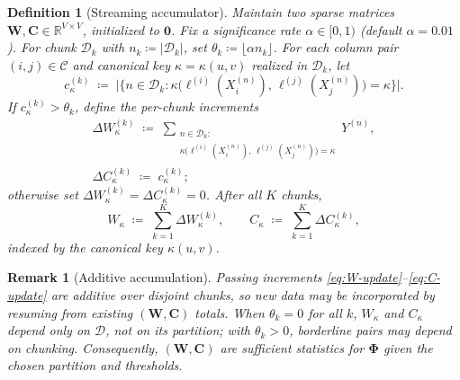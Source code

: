 \documentclass[11pt]{article}
\newtheorem{definition}{Definition}
\newtheorem{remark}{Remark}
\begin{document}
\begin{definition}[Streaming accumulator]
\label{def:accumulator}
Maintain two sparse matrices $\bm{W}, \bm{C} \in \mathbb{R}^{V \times V}$, initialized to $\bm{0}$.
Fix a significance rate $\alpha \in [0,1)$ (default $\alpha = 0.01$).
For chunk $\mathcal{D}_k$ with $n_k \coloneqq |\mathcal{D}_k|$, set $\theta_k \coloneqq \lfloor \alpha n_k \rfloor$.
For each column pair $(i,j) \in \mathcal{C}$ and canonical key $\kappa = \kappa(u,v)$ realized in $\mathcal{D}_k$, let
\[
  c_{\kappa}^{(k)} \;\coloneqq\;
  \bigl|\bigl\{n \in \mathcal{D}_k :
  \kappa\bigl(\ell^{(i)}(X_i^{(n)}),\,\ell^{(j)}(X_j^{(n)})\bigr) = \kappa\bigr\}\bigr|.
\]
If $c_{\kappa}^{(k)} > \theta_k$, define the per-chunk increments
\begin{align}
  \Delta W_{\kappa}^{(k)} \;\coloneqq\;
  \sum_{\substack{n \in \mathcal{D}_k :\\ \kappa\bigl(\ell^{(i)}(X_i^{(n)}),\,\ell^{(j)}(X_j^{(n)})\bigr)=\kappa}} Y^{(n)},
  \label{eq:W-update}\\[6pt]
  \Delta C_{\kappa}^{(k)} \;\coloneqq\; c_{\kappa}^{(k)};
  \label{eq:C-update}
\end{align}
otherwise set $\Delta W_{\kappa}^{(k)} = \Delta C_{\kappa}^{(k)} = 0$.
After all $K$ chunks,
\[
  W_{\kappa} \;\coloneqq\; \sum_{k=1}^{K} \Delta W_{\kappa}^{(k)}, \qquad
  C_{\kappa} \;\coloneqq\; \sum_{k=1}^{K} \Delta C_{\kappa}^{(k)},
\]
indexed by the canonical key $\kappa(u,v)$.
\end{definition}

\begin{remark}[Additive accumulation]
\label{rem:incremental}
Passing increments \eqref{eq:W-update}--\eqref{eq:C-update} are additive over disjoint chunks, so new data may be incorporated by resuming from existing $(\bm{W}, \bm{C})$ totals.
When $\theta_k = 0$ for all $k$, $W_{\kappa}$ and $C_{\kappa}$ depend only on $\mathcal{D}$, not on its partition; with $\theta_k > 0$, borderline pairs may depend on chunking.
Consequently, $(\bm{W}, \bm{C})$ are sufficient statistics for $\bm{\Phi}$ given the chosen partition and thresholds.
\end{remark}
\end{document}
